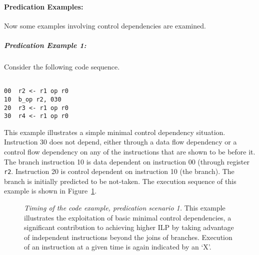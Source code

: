 \documentclass[10pt,dvips]{article}
\begin{document}
\paragraph{Predication Examples: }
Now some examples involving control dependencies are
examined. 
\subparagraph{Predication Example 1: }
Consider the following code sequence.

\begin{verbatim}

00	r2 <- r1 op r0
10	b_op r2, 030
20	r3 <- r1 op r0
30	r4 <- r1 op r0

\end{verbatim}

This example illustrates a simple minimal control dependency
situation.
Instruction 30 does not depend, either through a data flow dependency
or a control flow dependency on any of the instructions that
are shown to be before it.  The branch instruction 10 is data
dependent on instruction 00 (through register
{\tt r2}.
Instruction 20 is control
dependent on instruction 10 (the branch).
The branch is initially predicted to be not-taken.
The execution sequence of this example is shown
in Figure~\ref{pex1}.

\begin{figure}
\centering
{}
\caption{{\em Timing of the code example, predication scenario 1.}
This example illustrates the exploitation of basic minimal control
dependencies, a significant contribution to
achieving higher ILP by taking advantage of independent
instructions beyond the joins of branches.
Execution of an instruction at a given time is
again indicated by an `X'.}
\label{pex1}
\end{figure}
\end{document}
